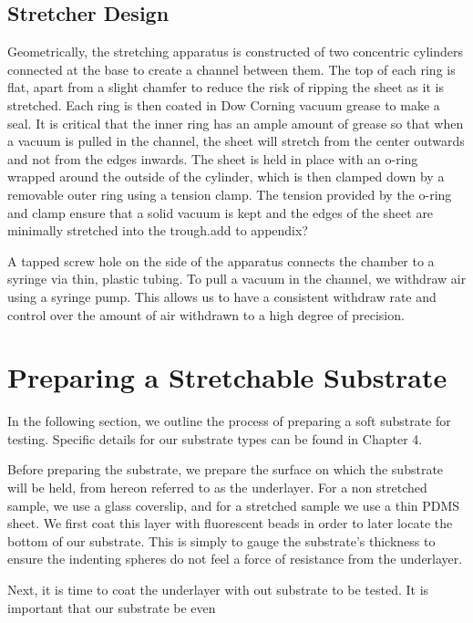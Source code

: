 \subsection{Stretcher Design}
Geometrically, the stretching apparatus is constructed of two concentric cylinders connected at the base to create a channel between them. The top of each ring is flat, apart from a slight chamfer to reduce the risk of ripping the sheet as it is stretched. Each ring is then coated in Dow Corning vacuum grease to make a seal. It is critical that the inner ring has an ample amount of grease so that when a vacuum is pulled in the channel, the sheet will stretch from the center outwards  and not from the edges inwards. The sheet is held in place with an o-ring wrapped around the outside of the cylinder, which is then clamped down by a removable outer ring using a tension clamp. The tension provided by the o-ring and clamp ensure that a solid vacuum is kept and the edges of the sheet are minimally stretched into the trough.add to appendix?


A tapped screw hole on the side of the apparatus connects the chamber to a syringe via thin, plastic tubing. To pull a vacuum in the channel, we withdraw air using a syringe pump. This allows us to have a consistent withdraw rate and control over the amount of air withdrawn to a high degree of precision.

\section{Preparing a Stretchable Substrate}
In the following section, we outline the process of preparing a soft substrate for testing. Specific details for our substrate types can be found in Chapter 4.

Before preparing the substrate, we prepare the surface on which the substrate will be held, from hereon referred to as the underlayer. For a non stretched sample, we use a glass coverslip, and for a stretched sample we use a thin PDMS sheet.  We first coat this layer with fluorescent beads in order to later locate the bottom of our substrate. This is simply to gauge the substrate's thickness to ensure the indenting spheres do not feel a force of resistance from the underlayer.

Next, it is time to coat the underlayer with out substrate to be tested. It is important that our substrate be even


